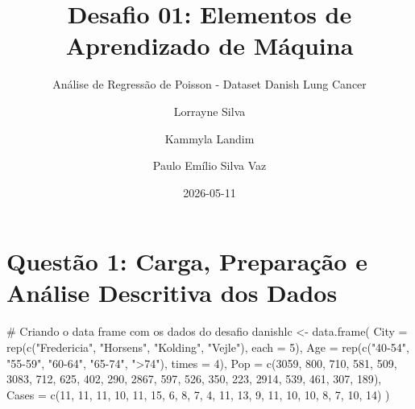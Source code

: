 \documentclass[
  letterpaper,
]{article}
\title{Desafio 01: Elementos de Aprendizado de Máquina}
\subtitle{Análise de Regressão de Poisson - Dataset Danish Lung Cancer}
\author{Lorrayne Silva \and Kammyla Landim \and Paulo Emílio Silva Vaz}
\date{2026-05-11}
\newenvironment{Shaded}{\begin{snugshade}}{\end{snugshade}}
\newcommand{\AttributeTok}[1]{\textcolor[rgb]{0.40,0.45,0.13}{#1}}
\newcommand{\CommentTok}[1]{\textcolor[rgb]{0.37,0.37,0.37}{#1}}
\newcommand{\DecValTok}[1]{\textcolor[rgb]{0.68,0.00,0.00}{#1}}
\newcommand{\FunctionTok}[1]{\textcolor[rgb]{0.28,0.35,0.67}{#1}}
\newcommand{\NormalTok}[1]{\textcolor[rgb]{0.00,0.23,0.31}{#1}}
\newcommand{\OtherTok}[1]{\textcolor[rgb]{0.00,0.23,0.31}{#1}}
\newcommand{\StringTok}[1]{\textcolor[rgb]{0.13,0.47,0.30}{#1}}
\renewcommand*\contentsname{Table of contents}
\newcommand\contentsname{Table of contents}
\begin{document}
\maketitle

\renewcommand*\contentsname{Table of contents}
{
\setcounter{tocdepth}{3}
\tableofcontents
}

\section{Questão 1: Carga, Preparação e Análise Descritiva dos
Dados}\label{questuxe3o-1-carga-preparauxe7uxe3o-e-anuxe1lise-descritiva-dos-dados}

\begin{Shaded}
\begin{Highlighting}[]
\CommentTok{\# Criando o data frame com os dados do desafio}
\NormalTok{danishlc }\OtherTok{\textless{}{-}} \FunctionTok{data.frame}\NormalTok{(}
  \AttributeTok{City =} \FunctionTok{rep}\NormalTok{(}\FunctionTok{c}\NormalTok{(}\StringTok{"Fredericia"}\NormalTok{, }\StringTok{"Horsens"}\NormalTok{, }\StringTok{"Kolding"}\NormalTok{, }\StringTok{"Vejle"}\NormalTok{), }\AttributeTok{each =} \DecValTok{5}\NormalTok{),}
  \AttributeTok{Age =} \FunctionTok{rep}\NormalTok{(}\FunctionTok{c}\NormalTok{(}\StringTok{"40{-}54"}\NormalTok{, }\StringTok{"55{-}59"}\NormalTok{, }\StringTok{"60{-}64"}\NormalTok{, }\StringTok{"65{-}74"}\NormalTok{, }\StringTok{"\textgreater{}74"}\NormalTok{), }\AttributeTok{times =} \DecValTok{4}\NormalTok{),}
  \AttributeTok{Pop =} \FunctionTok{c}\NormalTok{(}\DecValTok{3059}\NormalTok{, }\DecValTok{800}\NormalTok{, }\DecValTok{710}\NormalTok{, }\DecValTok{581}\NormalTok{, }\DecValTok{509}\NormalTok{,  }
          \DecValTok{3083}\NormalTok{, }\DecValTok{712}\NormalTok{, }\DecValTok{625}\NormalTok{, }\DecValTok{402}\NormalTok{, }\DecValTok{290}\NormalTok{,  }
          \DecValTok{2867}\NormalTok{, }\DecValTok{597}\NormalTok{, }\DecValTok{526}\NormalTok{, }\DecValTok{350}\NormalTok{, }\DecValTok{223}\NormalTok{,  }
          \DecValTok{2914}\NormalTok{, }\DecValTok{539}\NormalTok{, }\DecValTok{461}\NormalTok{, }\DecValTok{307}\NormalTok{, }\DecValTok{189}\NormalTok{),}
  \AttributeTok{Cases =} \FunctionTok{c}\NormalTok{(}\DecValTok{11}\NormalTok{, }\DecValTok{11}\NormalTok{, }\DecValTok{11}\NormalTok{, }\DecValTok{10}\NormalTok{, }\DecValTok{11}\NormalTok{,  }
            \DecValTok{15}\NormalTok{, }\DecValTok{6}\NormalTok{, }\DecValTok{8}\NormalTok{, }\DecValTok{7}\NormalTok{, }\DecValTok{4}\NormalTok{,  }
            \DecValTok{11}\NormalTok{, }\DecValTok{13}\NormalTok{, }\DecValTok{9}\NormalTok{, }\DecValTok{11}\NormalTok{, }\DecValTok{10}\NormalTok{,  }
            \DecValTok{10}\NormalTok{, }\DecValTok{8}\NormalTok{, }\DecValTok{7}\NormalTok{, }\DecValTok{10}\NormalTok{, }\DecValTok{14}\NormalTok{)}
\NormalTok{)}


\end{Highlighting}
\end{Shaded}
\end{document}
